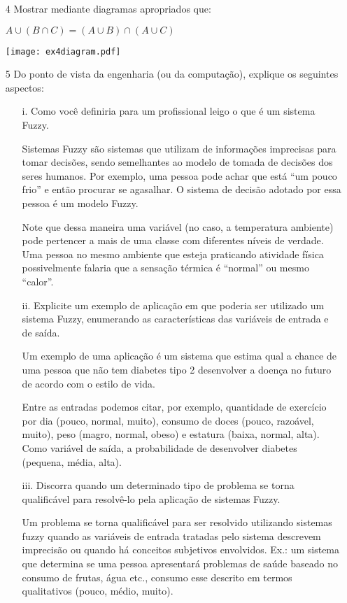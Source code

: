 \documentclass{report}
\begin{document}
\begin{enumerate}
\begin{enumerate}
\end{enumerate}


\item[4] Mostrar mediante diagramas apropriados que:

$A \cup (B \cap C) = (A \cup B) \cap (A \cup C)$

\texttt{[image: ex4diagram.pdf]}


\item[5] Do ponto de vista da engenharia (ou da computação), explique os seguintes aspectos:

\begin{enumerate}
\item[i.] Como você definiria para um profissional leigo o que é um sistema Fuzzy.

Sistemas Fuzzy são sistemas que utilizam de informações imprecisas para tomar decisões, sendo semelhantes 
ao modelo de tomada de decisões dos seres humanos. Por exemplo, uma pessoa pode achar que está ``um pouco
frio'' e então procurar se agasalhar. O sistema de decisão adotado por essa pessoa é um modelo Fuzzy. 

Note que dessa maneira uma variável (no caso, a temperatura ambiente) 
pode pertencer a mais de uma classe com diferentes níveis de verdade. Uma pessoa no
mesmo ambiente que esteja praticando atividade física possivelmente falaria que a sensação térmica é ``normal'' ou mesmo
``calor''.

\item[ii.] Explicite um exemplo de aplicação em que poderia ser utilizado um sistema Fuzzy, 
enumerando as características das variáveis de entrada e de saída.

Um exemplo de uma aplicação é um sistema que estima qual a chance de uma pessoa que não tem diabetes tipo 2
desenvolver a doença no futuro de acordo com o estilo de vida. 

Entre as entradas podemos citar, por exemplo, quantidade 
de exercício por dia (pouco, normal, muito), consumo de doces (pouco, razoável, muito), peso (magro, normal, obeso) e 
estatura (baixa, normal, alta).  Como variável de saída, a probabilidade de desenvolver diabetes (pequena, média, alta).

\item[iii.] Discorra quando um determinado tipo de problema se torna qualificável para 
resolvê-lo pela aplicação de sistemas Fuzzy.

Um problema se torna qualificável para ser resolvido utilizando sistemas fuzzy quando as variáveis de entrada tratadas pelo sistema
descrevem imprecisão ou quando há conceitos subjetivos envolvidos. Ex.: um sistema que determina se uma pessoa apresentará problemas
de saúde baseado no consumo de frutas, água etc., consumo esse descrito em termos qualitativos (pouco, médio, muito).


\end{enumerate}
\end{enumerate}
\end{document}
